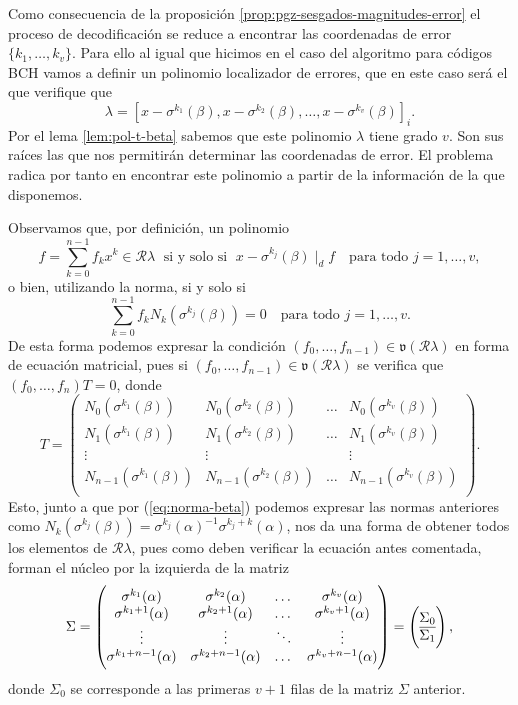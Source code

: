 Como consecuencia de la proposición \ref{prop:pgz-sesgados-magnitudes-error} el proceso de decodificación se reduce a encontrar las coordenadas de error \(\{k_1, \dots, k_v\}\).
Para ello al igual que hicimos en el caso del algoritmo para códigos BCH vamos a definir un polinomio localizador de errores, que en este caso será el que verifique que 
\[
  \lambda = \left[x - \sigma^{k_1}(\beta), x - \sigma^{k_2}(\beta), \dots, x - \sigma^{k_v}(\beta)\right]_{i}.
\]
Por el lema \ref{lem:pol-t-beta} sabemos que este polinomio \(\lambda\) tiene grado \(v\).
Son sus raíces las que nos permitirán determinar las coordenadas de error.
El problema radica por tanto en encontrar este polinomio a partir de la información de la que disponemos.

Observamos que, por definición, un polinomio 
\[
  f = \sum_{k = 0}^{n-1}f_k x^{k} \in \mathcal R\lambda \;\text{ si y solo si }\; x - \sigma^{k_j}(\beta) \mid_d f \quad\text{para todo } j = 1, \dots, v,
\]
o bien, utilizando la norma, si y solo si
\[
  \sum_{k=0}^{n -1}f_k N_k(\sigma^{k_j}(\beta))= 0 \quad\text{para todo } j = 1, \dots, v.
\]
De esta forma podemos expresar la condición \((f_0, \dots, f_{n-1}) \in \mathfrak v(\mathcal R\lambda)\) en forma de ecuación matricial, pues si \((f_0, \dots, f_{n-1}) \in \mathfrak v(\mathcal R\lambda)\) se verifica que \((f_0, \dots, f_n)T = 0\), donde
\[
  T = \begin{pmatrix}
    N_{0}(\sigma^{k_1}(\beta)) & N_{0}(\sigma^{k_2}(\beta)) & \dots & N_{0}(\sigma^{k_v}(\beta))\\
    N_{1}(\sigma^{k_1}(\beta)) & N_{1}(\sigma^{k_2}(\beta)) & \dots & N_{1}(\sigma^{k_v}(\beta))\\
    \vdots & \vdots & & \vdots\\
    N_{n-1}(\sigma^{k_1}(\beta)) & N_{n-1}(\sigma^{k_2}(\beta)) & \dots & N_{n-1}(\sigma^{k_v}(\beta))\\
  \end{pmatrix}.
\]
Esto, junto a que por (\ref{eq:norma-beta}) podemos expresar las normas anteriores como \(N_k(\sigma^{k_j}(\beta)) = \sigma^{k_j}(\alpha)^{-1}\sigma^{k_j + k}(\alpha)\), nos da una forma de obtener todos los elementos de \(\mathcal R\lambda\), pues como deben verificar la ecuación antes comentada, forman el núcleo por la izquierda de la matriz
\[
  \Sigma = \begin{pmatrix}
    \sigma^{k_1}(\alpha) & \sigma^{k_2}(\alpha) & \dots & \sigma^{k_v}(\alpha)\\
    \sigma^{k_1 + 1}(\alpha) & \sigma^{k_2 + 1}(\alpha) & \dots & \sigma^{k_v + 1}(\alpha)\\
    \vdots & \vdots & \ddots & \vdots \\
    \sigma^{k_1 + n - 1}(\alpha) & \sigma^{k_2 + n - 1}(\alpha) & \dots & \sigma^{k_v + n - 1}(\alpha)\\
  \end{pmatrix}
  = \left( \begin{array}{@{}c@{}}
    \Sigma_0\\\hline
    \Sigma_1
  \end{array}\right),
\]
donde \(\Sigma_0\) se corresponde a las primeras \(v + 1\) filas de la matriz \(\Sigma\) anterior.

